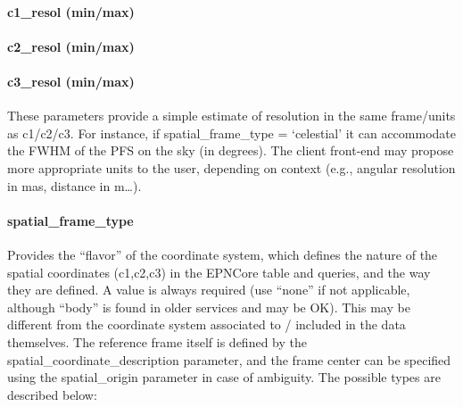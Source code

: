 \documentclass[11pt,a4paper]{ivoa}
\begin{document}
\paragraph{c1\_resol (min/max)}

\paragraph{c2\_resol (min/max)}

\paragraph{c3\_resol (min/max)}

These parameters provide a simple estimate of resolution in the same
frame/units as c1/c2/c3. For instance, if spatial\_frame\_type =
`celestial' it can accommodate the FWHM of the PFS on the sky (in
degrees). The client front-end may propose more appropriate units to the
user, depending on context (e.g., angular resolution in mas, distance
in m…).

\paragraph{spatial\_frame\_type}

Provides the ``flavor'' of the coordinate system, which defines the nature
of the spatial coordinates (c1,c2,c3) in the EPNCore table and queries,
and the way they are defined. A value is always required (use ``none''
if not applicable, although ``body'' is found in older services and may
be OK). This may be different from the coordinate system associated to /
included in the data themselves. The reference frame itself is defined by
the spatial\_coordinate\_description parameter, and the frame center can
be specified using the spatial\_origin parameter in case of ambiguity.
The possible types are described below:
\end{document}
